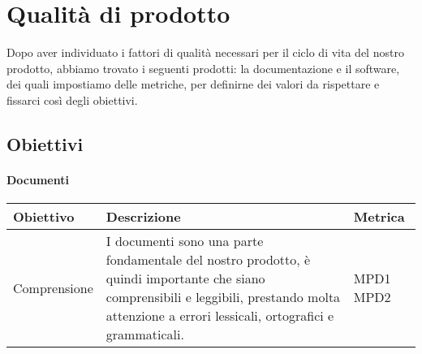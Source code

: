 \chapter{Qualità di prodotto}
Dopo aver individuato i fattori di qualità necessari per il ciclo di vita del nostro prodotto, abbiamo trovato i seguenti prodotti: la documentazione
e il software, dei quali impostiamo delle metriche, per definirne dei valori da rispettare e fissarci così degli obiettivi.
\section{Obiettivi}
\subsubsection{Documenti}
\begin{center}
  \begin{tabular}{|p{2.5cm}|p{8cm}|p{1.5cm}|} \hline
    \textbf{Obiettivo} & \textbf{Descrizione} & \textbf{Metrica}  \\ \hline
    Comprensione & I documenti sono una parte fondamentale del nostro prodotto, è quindi importante che siano comprensibili e leggibili, prestando molta attenzione
    a errori lessicali, ortografici e grammaticali.  & MPD1 \newline MPD2       \\ \hline
  \end{tabular}
\end{center}

